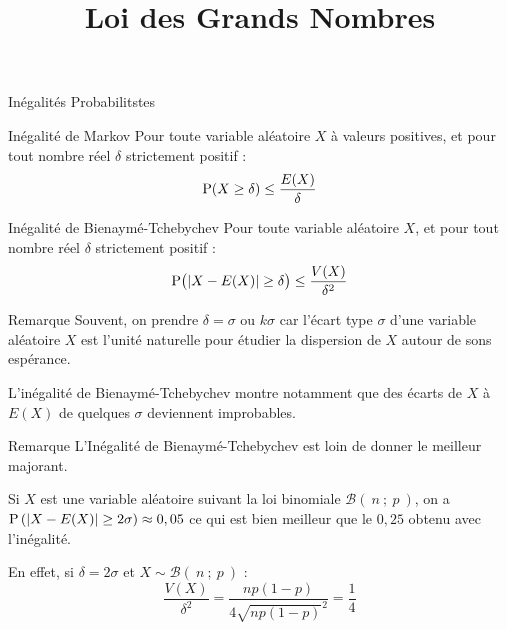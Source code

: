 \documentclass{cours}
\title{Loi des Grands Nombres}
\begin{document}

    \begin{Gpartie}{Inégalités Probabilitstes} 
        \begin{Spartie}{Inégalité de Markov} 
            Pour toute variable aléatoire $X$ à valeurs positives, et pour tout nombre réel $\delta$ strictement positif : \[\mathrm{P}(X\geq\delta)\leq\frac{E(X)}{\delta}\]
        \end{Spartie}
        \begin{Spartie}{Inégalité de Bienaymé-Tchebychev} 
            Pour toute variable aléatoire $X$, et pour tout nombre réel $\delta$ strictement positif : \[\mathrm{P}\big(\lvert X-E(X)\rvert\geq\delta\big)\leq\frac{V(X)}{\delta^2}\]
        \end{Spartie}
        \begin{Spartie}{Remarque} 
            Souvent, on prendre $\delta=\sigma$ ou $k\sigma$ car l'écart type $\sigma$ d'une variable aléatoire $X$ est l'unité naturelle pour étudier la dispersion de $X$ autour de sons espérance.

            L'inégalité de Bienaymé-Tchebychev montre notamment que des écarts de $X$ à $E(X)$ de quelques $\sigma$ deviennent improbables.
        \end{Spartie}
        \begin{Spartie}{Remarque} 
            L'Inégalité de Bienaymé-Tchebychev est loin de donner le meilleur majorant.

            Si $X$ est une variable aléatoire suivant la loi binomiale $\mathcal{B}\left(~n~;~p~\right)$, on a $\mathrm{P}\left(\vert X-E(X)\rvert\geq 2\sigma\right)\approx 0,05$ ce qui est bien meilleur que le $0,25$ obtenu avec l'inégalité.

            En effet, si $\delta=2\sigma$ et $X\sim\mathcal{B}(~n~;~p~)$ : \[\frac{V(X)}{\delta^2}=\frac{np(1-p)}{4\sqrt{np(1-p)}^2}=\frac{1}{4}\]
        \end{Spartie}
    \end{Gpartie}
    \pagebreak
\end{document}
